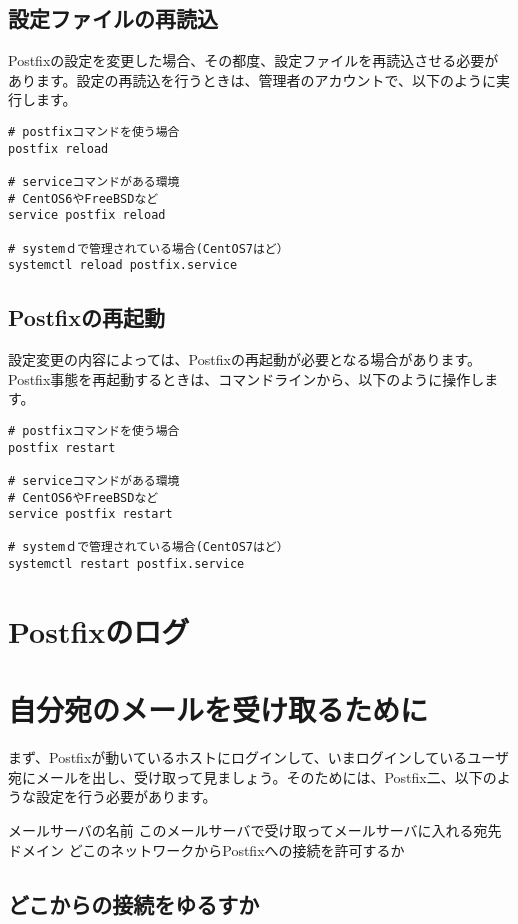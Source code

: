 \subsection{設定ファイルの再読込}
Postfixの設定を変更した場合、その都度、設定ファイルを再読込させる必要があります。設定の再読込を行うときは、管理者のアカウントで、以下のように実行します。

\begin{lstlisting}[basicstyle=\ttfamily\footnotesize, frame=single]
# postfixコマンドを使う場合
postfix reload

# serviceコマンドがある環境
# CentOS6やFreeBSDなど
service postfix reload

# systemｄで管理されている場合(CentOS7はど）
systemctl reload postfix.service
\end{lstlisting}

\subsection{Postfixの再起動}
設定変更の内容によっては、Postfixの再起動が必要となる場合があります。Postfix事態を再起動するときは、コマンドラインから、以下のように操作します。

\begin{lstlisting}[basicstyle=\ttfamily\footnotesize, frame=single]
# postfixコマンドを使う場合
postfix restart

# serviceコマンドがある環境
# CentOS6やFreeBSDなど
service postfix restart

# systemｄで管理されている場合(CentOS7はど）
systemctl restart postfix.service
\end{lstlisting}

\section{Postfixのログ}

\section{自分宛のメールを受け取るために}

まず、Postfixが動いているホストにログインして、いまログインしているユーザ宛にメールを出し、受け取って見ましょう。そのためには、Postfix二、以下のような設定を行う必要があります。

メールサーバの名前
このメールサーバで受け取ってメールサーバに入れる宛先ドメイン
どこのネットワークからPostfixへの接続を許可するか

\subsection{どこからの接続をゆるすか}
